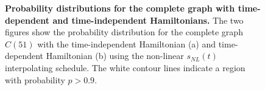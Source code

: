 \begin{figure}[ht]
  \caption[]{\textbf{Probability distributions for the complete graph  with time-dependent and time-independent Hamiltonians.} The two figures show the probability distribution for the complete graph $C(51)$ with the time-independent Hamiltonian (a) and time-dependent Hamiltonian (b) using the non-linear $s_{NL}(t)$ interpolating schedule. The white contour lines indicate a region with probability $p>0.9$.   }
  \label{fig:heatmap-complete}
\end{figure}

